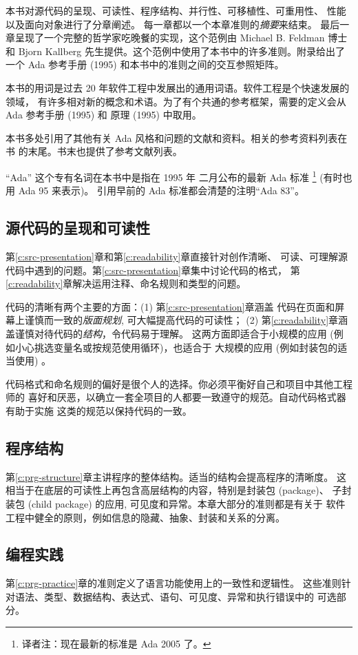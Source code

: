 本书对源代码的呈现、可读性、程序结构、并行性、可移植性、可重用性、
性能以及面向对象进行了分章阐述。 每一章都以一个本章准则的\emph{摘要}来结束。
最后一章呈现了一个完整的哲学家吃晚餐的实现，这个范例由 Michael B. Feldman 博士
和 Bjorn Kallberg 先生提供。这个范例中使用了本书中的许多准则。附录给出了一个
Ada 参考手册 (1995) 和本书中的准则之间的交互参照矩阵。

本书的用词是过去 20 年软件工程中发展出的通用词语。软件工程是个快速发展的领域，
有许多相对新的概念和术语。为了有个共通的参考框架，需要的定义会从 Ada 参考手册
(1995) 和 原理 (1995) 中取用。

本书多处引用了其他有关 Ada 风格和问题的文献和资料。相关的参考资料列表在书
的末尾。书末也提供了参考文献列表。

``Ada'' 这个专有名词在本书中是指在 1995 年 二月公布的最新 Ada 标准
\footnote{译者注：现在最新的标准是 Ada 2005 了。} (有时也用 Ada 95 来表示)。
引用早前的 Ada 标准都会清楚的注明``Ada 83''。

\subsection{源代码的呈现和可读性}
第\ref{c:src-presentation}章和第\ref{c:readability}章直接针对创作清晰、
可读、可理解源代码中遇到的问题。第\ref{c:src-presentation}章集中讨论代码的格式，
第\ref{c:readability}章解决运用注释、命名规则和类型的问题。

代码的清晰有两个主要的方面：(1) 第\ref{c:src-presentation}章涵盖
代码在页面和屏幕上谨慎而一致的\emph{版面规划}, 可大幅提高代码的可读性；
(2) 第\ref{c:readability}章涵盖谨慎对待代码的\emph{结构}，令代码易于理解。
这两方面即适合于小规模的应用 (例如小心挑选变量名或按规范使用循环)，也适合于
大规模的应用 (例如封装包的适当使用) 。

代码格式和命名规则的偏好是很个人的选择。你必须平衡好自己和项目中其他工程师的
喜好和厌恶，以确立一套全项目的人都要一致遵守的规范。自动代码格式器有助于实施
这类的规范以保持代码的一致。

\subsection{程序结构}
第\ref{c:prg-structure}章主讲程序的整体结构。适当的结构会提高程序的清晰度。
这相当于在底层的可读性上再包含高层结构的内容，特别是封装包 (package)、
子封装包 (child package) 的应用, 可见度和异常。本章大部分的准则都是有关于
软件工程中健全的原则，例如信息的隐藏、抽象、封装和关系的分离。

\subsection{编程实践}
第\ref{c:prg-practice}章的准则定义了语言功能使用上的一致性和逻辑性。
这些准则针对语法、类型、数据结构、表达式、语句、可见度、异常和执行错误中的
可选部分。

